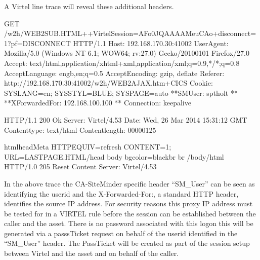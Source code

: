 \documentclass[letterpaper,10pt,english]{sphinxmanual}
\begin{document}
A Virtel line trace will reveal these additional headers.

\begin{sphinxVerbatim}[commandchars=\\\{\}]
GET /w2h/WEB2SUB.HTML++VirtelSession=AFo0JQAAAAMeuCAo+disconnect=1?pf=DISCONNECT HTTP/1.1
Host: 192.168.170.30:41002
User\PYGZhy{}Agent: Mozilla/5.0 (Windows NT 6.1; WOW64; rv:27.0) Gecko/20100101 Firefox/27.0
Accept: text/html,application/xhtml+xml,application/xml;q=0.9,\PYGZbs{}*/\PYGZbs{}*;q=0.8
Accept\PYGZhy{}Language: en\PYGZhy{}gb,en;q=0.5
Accept\PYGZhy{}Encoding: gzip, deflate
Referer: http://192.168.170.30:41002/w2h/WEB2AJAX.htm+CICS
Cookie: SYSLANG=en; SYSSTYL=BLUE; SYSPAGE=auto
**SM\PYGZus{}User: sptholt \PYGZlt{}\PYGZlt{}**
**X\PYGZhy{}Forwarded\PYGZhy{}For: 192.168.100.100 \PYGZlt{}\PYGZlt{}**
Connection: keep\PYGZhy{}alive

HTTP/1.1 200 Ok
Server: Virtel/4.53
Date: Wed, 26 Mar 2014 15:31:12 GMT
Content\PYGZhy{}type: text/html
Content\PYGZhy{}length: 00000125

\PYGZlt{}html\PYGZgt{}\PYGZlt{}head\PYGZgt{}\PYGZlt{}Meta HTTP\PYGZhy{}EQUIV=\PYGZdq{}refresh\PYGZdq{} CONTENT=\PYGZdq{}1; URL=LASTPAGE.HTML\PYGZdq{}\PYGZgt{}\PYGZlt{}/head\PYGZgt{}
\PYGZlt{}body bgcolor=\PYGZdq{}black\PYGZdq{}\PYGZgt{}\PYGZlt{}br\PYGZgt{}
\PYGZlt{}br\PYGZgt{}
\PYGZlt{}/body\PYGZgt{}\PYGZlt{}/html\PYGZgt{}
HTTP/1.0 205 Reset Content
Server: Virtel/4.53
\end{sphinxVerbatim}

In the above trace the CA-SiteMinder specific header “SM\_User” can be seen as identifying the userid and the X-Forwarded-For:, a standard HTTP header, identifies the source IP address. For security reasons this proxy IP address must be tested for in a VIRTEL rule before the session can be established between the caller and the asset. There is no password associated with this logon \textendash{} this will be generated via a passsTicket request on behalf of the userid identified in the “SM\_User” header. The PassTicket will be created as part of the session setup between Virtel and the asset and on behalf of the caller.

\newpage

\ignorespaces 
\end{document}
